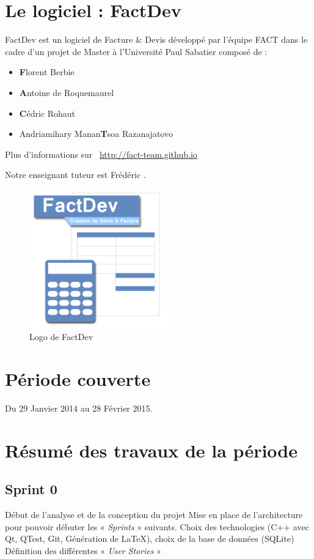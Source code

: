 \documentclass[12pt,a4paper,openany]{article}
\begin{document}
	\thispagestyle{empty} %
	\titleBC 
	\newpage
	\setcounter{tocdepth}{1}
	\setcounter{secnumdepth}{3}
	
	\tableofcontents
	\newpage
	\section{Le logiciel : FactDev}
	FactDev est un logiciel de Facture \& Devis développé par l'équipe FACT dans le cadre d'un projet de Master à l'Université Paul Sabatier composé de : 
	\begin{itemize}
		\item \textbf{F}lorent Berbie
		\item \textbf{A}ntoine de Roquemaurel
		\item \textbf{C}édric Rohaut
		\item Andriamihary Manan\textbf{T}soa Razanajatovo
	\end{itemize}

	Plus d’informations sur \Mundus~\url{http://fact-team.github.io}

	Notre enseignant tuteur est Frédéric .

	\begin{figure}[H]
		\centering
		\includegraphics[width=6cm]{../FACTDev.png}
		\caption{Logo de FactDev}
	\end{figure}

	\section{Période couverte}
	Du 29 Janvier 2014 au 28 Février 2015.

	\section{Résumé des travaux de la période}
	\subsection{Sprint 0}
	Début de l'analyse et de la conception du projet
	Mise en place de l'architecture pour pouvoir débuter les « \textit{Sprints} » suivants. 
	Choix des technologies (C++ avec Qt, QTest, Git, Génération de \LaTeX{}), choix de la base de données (SQLite)
	Définition des différentes « \textit{User Stories} »
\end{document}
